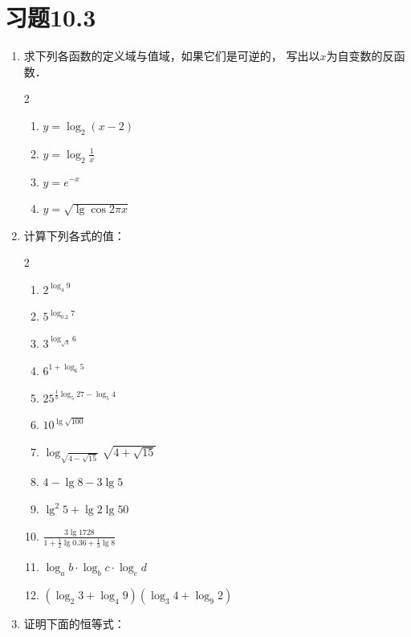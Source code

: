 \section*{习题10.3}
\begin{enumerate}
  \item 求下列各函数的定义域与值域，如果它们是可逆的，
  写出以$x$为自变数的反函数．
  \begin{multicols}{2}
    \begin{enumerate}
      \item $y=\log_2(x-2)$
      \item $y=\log_2\frac{1}{x}$
      \item $y=e^{-x}$
      \item $y=\sqrt{\lg\cos2\pi x}$
    \end{enumerate}
  \end{multicols}

  \item 计算下列各式的值：
\begin{multicols}{2}
\begin{enumerate}
  \item $2^{\log_4 9}$
  \item $5^{\log_{0.2} 7}$
  \item $3^{\log_{\sqrt{3}}6}$
  \item $6^{1+\log_6 5}$
  \item $25^{\tfrac{1}{3} \log_5 27-\log_{5} 4}$
  \item $10^{\lg\sqrt{100}}$
  \item $\log _{\sqrt{4-\sqrt{15}}} \sqrt{4+\sqrt{15}}$
  \item $4-\lg 8-3 \lg 5$
  \item $ \lg ^{2} 5+\lg 2 \lg 50$
  \item $\frac{3 \lg 1728}{1+\frac{1}{2} \lg 0.36+\frac{1}{3} \lg 8}$
  \item $\log _{a} b \cdot \log _{b} c \cdot \log _{c} d$
  \item $\left(\log _{2} 3+\log _{4} 9\right)\left(\log _{3} 4+\log _{9} 2\right)$
\end{enumerate}
\end{multicols}

\item 证明下面的恒等式：
\begin{enumerate}


\end{enumerate}
\end{enumerate}
